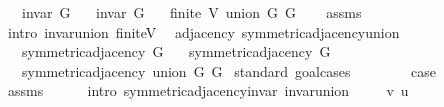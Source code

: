 \begin{isabellebody}
\ \ \ {\isachardoublequoteopen}invar\ G{}{\isachardoublequoteclose}\isanewline
\ \ \ {\isachardoublequoteopen}invar\ G{}{\isachardoublequoteclose}\isanewline
\ \ \ {\isachardoublequoteopen}finite\ {\isacharparenleft}{\kern0pt}V\ {\isacharparenleft}{\kern0pt}union\ G{}\ G{}{\isacharparenright}{\kern0pt}{\isacharparenright}{\kern0pt}{\isachardoublequoteclose}\isanewline
%
\isadelimproof
\ \ %
\endisadelimproof
%
\isatagproof
{}\isamarkupfalse%
\ assms\isanewline
\ \ \isamarkupfalse%
\ {\isacharparenleft}{\kern0pt}intro\ invar{\isacharunderscore}{\kern0pt}union\ finite{\isacharunderscore}{\kern0pt}V{\isacharparenright}{\kern0pt}%
\endisatagproof
{\isafoldproof}%
%
\isadelimproof
\isanewline
%
\endisadelimproof
\isanewline
{}\isamarkupfalse%
\ {\isacharparenleft}{\kern0pt}\ adjacency{\isacharparenright}{\kern0pt}\ symmetric{\isacharunderscore}{\kern0pt}adjacency{\isacharunderscore}{\kern0pt}union{\isacharcolon}{\kern0pt}\isanewline
\ \ \ {\isachardoublequoteopen}symmetric{\isacharunderscore}{\kern0pt}adjacency{\isacharprime}{\kern0pt}\ G{}{\isachardoublequoteclose}\isanewline
\ \ \ {\isachardoublequoteopen}symmetric{\isacharunderscore}{\kern0pt}adjacency{\isacharprime}{\kern0pt}\ G{}{\isachardoublequoteclose}\isanewline
\ \ \ {\isachardoublequoteopen}symmetric{\isacharunderscore}{\kern0pt}adjacency{\isacharprime}{\kern0pt}\ {\isacharparenleft}{\kern0pt}union\ G{}\ G{}{\isacharparenright}{\kern0pt}{\isachardoublequoteclose}\isanewline
%
\isadelimproof
%
\endisadelimproof
%
\isatagproof
{}\isamarkupfalse%
\ {\isacharparenleft}{\kern0pt}standard{\isacharcomma}{\kern0pt}\ goal{\isacharunderscore}{\kern0pt}cases{\isacharparenright}{\kern0pt}\isanewline
\ \ \isamarkupfalse%
\ {}\isanewline
\ \ \isamarkupfalse%
\ {\isacharquery}{\kern0pt}case\isanewline
\ \ \ \ \isamarkupfalse%
\ assms\isanewline
\ \ \ \ \isamarkupfalse%
\ {\isacharparenleft}{\kern0pt}intro\ symmetric{\isacharunderscore}{\kern0pt}adjacency{\isachardot}{\kern0pt}invar\ invar{\isacharunderscore}{\kern0pt}union{\isacharparenright}{\kern0pt}\isanewline
{}\isamarkupfalse%
\isanewline
\ \ \isamarkupfalse%
\ {\isacharparenleft}{\kern0pt}{}\ v\ u{\isacharparenright}{\kern0pt}\isanewline
\ \ \isamarkupfalse%

\end{isabellebody}
